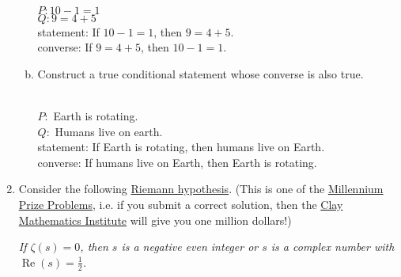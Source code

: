 \documentclass[12pt]{amsart}
\begin{document}
\begin{enumerate}[{\bfseries 1.}]
\begin{enumerate}[(a)]
	\begin{normalize}
	    \vspace{0.1in}
        \\$P: 10 - 1 = 1$
        \\$Q: 9 = 4 + 5$
        \\statement: If $10 - 1 = 1$, then $9 = 4 + 5$.
        \\converse: If $9 = 4 + 5$, then $10 - 1 = 1$. 
        \\
    \end{normalize}
	\item Construct a true conditional statement whose converse is also true.
	\begin{normalize}
	    \vspace{0.1in}
        \\$P:$ Earth is rotating.
        \\$Q:$ Humans live on earth.
        \\statement: If Earth is rotating, then humans live on Earth.
        \\converse: If humans live on Earth, then Earth is rotating.
    \end{normalize}
	\end{enumerate}

\newpage
\item Consider the following \href{https://en.wikipedia.org/wiki/Riemann_hypothesis}{Riemann hypothesis}. (This is one of the \href{https://en.wikipedia.org/wiki/Millennium_Prize_Problems}{Millennium Prize Problems}, i.e. if you submit a correct solution, then the \href{https://en.wikipedia.org/wiki/Clay_Mathematics_Institute}{Clay Mathematics Institute} will give you one million dollars!)

	\vspace{0.1in}
	\noindent
	\textit{\footnotemark[2] If $\zeta(s)=0$, then $s$ is a negative even integer or $s$ is a complex number with $\displaystyle\operatorname{Re}(s)=\frac{1}{2}$.}


\end{enumerate}
\end{document}
